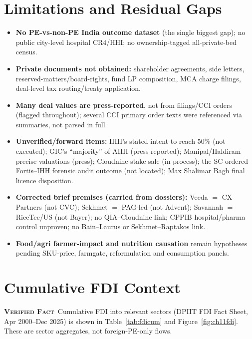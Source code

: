 \documentclass[11pt,a4paper]{article}
\newcommand{\VF}{\textcolor{vfcol}{\textsc{\textbf{Verified Fact}}}}
\begin{document}
\section{Limitations and Residual Gaps}\label{sec:limitations}
\begin{itemize}[leftmargin=1.4em,itemsep=2pt]
\item \textbf{No PE-vs-non-PE India outcome dataset} (the single biggest gap); no public city-level hospital CR4/HHI; no ownership-tagged all-private-bed census.
\item \textbf{Private documents not obtained:} shareholder agreements, side letters, reserved-matters/board-rights, fund LP composition, MCA charge filings, deal-level tax routing/treaty application.
\item \textbf{Many deal values are press-reported}, not from filings/CCI orders (flagged throughout); several CCI primary order texts were referenced via summaries, not parsed in full.
\item \textbf{Unverified/forward items:} IHH's stated intent to reach 50\% (not executed); GIC's ``majority'' of AHH (press-reported); Manipal/Haldiram precise valuations (press); Cloudnine stake-sale (in process); the SC-ordered Fortis--IHH forensic audit outcome (not located); Max Shalimar Bagh final licence disposition.
\item \textbf{Corrected brief premises (carried from dossiers):} Veeda $=$ CX Partners (not CVC); Sekhmet $=$ PAG-led (not Advent); Savannah $=$ RiceTec/US (not Bayer); no QIA--Cloudnine link; CPPIB hospital/pharma control unproven; no Bain--Laurus or Sekhmet--Raptakos link.
\item \textbf{Food/agri farmer-impact and nutrition causation} remain hypotheses pending SKU-price, farmgate, reformulation and consumption panels.
\end{itemize}

\section{Cumulative FDI Context}\label{sec:fdi}
\VF\ Cumulative FDI into relevant sectors (DPIIT FDI Fact Sheet, Apr 2000--Dec 2025) is shown in Table~\ref{tab:fdicum} and Figure~\ref{fig:ch11fdi}. These are sector aggregates, not foreign-PE-only flows.
\end{document}
